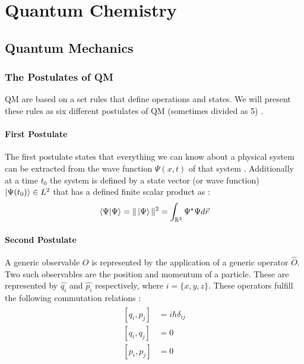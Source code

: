 \documentclass[../master_thesis.tex]{subfiles}
\begin{document}
\chapter{Quantum Chemistry}
\section{Quantum Mechanics}

\subsection{The Postulates of \ac{QM}}

\ac{QM} are based on a set rules that define operations and states. We will
present these rules as six different postulates of \ac{QM} (sometimes divided
as 5) \cite{Atkins:2011, Cohen:1973}.

\subsubsection{First Postulate}
The first postulate states that everything we can know about a physical system
can be extracted from the wave function $\Psi(x, t)$ of that system
\cite{Atkins:2011}. Additionally at a time $t_0$ the system is defined by
a state vector (or wave function) $\ket{\Psi(t_0)}\in L^2$ that has a defined
finite scalar product as \cite{Cohen:1973}:
\begin{equation}
  \braket{\Psi|\Psi} = \|\ket{\Psi}\|^2 =  \int_{\mathbb{R}^3}\Psi^\star\Psi d\vec{r}
\end{equation}

\subsubsection{Second Postulate}
A generic observable $O$ is represented by the application of a generic operator
$\hat{O}$. Two such observables are the position and momentum of a particle. These are
represented by $\hat{q_i}$ and $\hat{p_i}$ respectively, where
$i = \{x, y, z\}$. These operators fulfill the following commutation relations
\cite{Atkins:2011, Cohen:1973}:
\begin{align}
  \begin{split}
    [q_i, p_j] &= i \hbar \delta_{ij}\\
    [q_i, q_j] &= 0 \\
    [p_i, p_j] &= 0
  \end{split}
\end{align}
\end{document}
